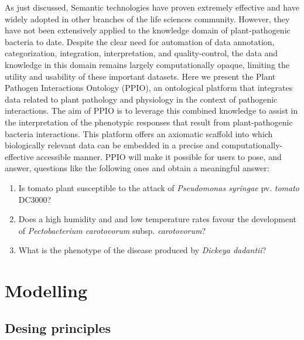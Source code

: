 \documentclass[sw]{iosart2c}
\begin{document}
As just discussed, Semantic technologies have proven extremely effective and have widely adopted in other branches of the life sciences community. However, they have not been extensively applied to the knowledge domain of plant-pathogenic bacteria to date. Despite the clear need for automation of data annotation, categorization, integration, interpretation, and quality-control, the data and knowledge in this domain remains largely computationally opaque, limiting the utility and usability of these important datasets. Here we present the Plant Pathogen Interactions Ontology (PPIO), an ontological platform that integrates data related to plant pathology and physiology in the context of pathogenic interactions. The aim of PPIO is to leverage this combined knowledge to assist in the interpretation of the phenotypic responses that result from plant-pathogenic bacteria interactions. This platform offers an axiomatic scaffold into which biologically relevant data can be embedded in a precise and computationally-effective accessible manner. PPIO will make it possible for users to pose, and answer, questions like the following ones and obtain a meaningful answer:

\begin{enumerate}
\item Is tomato plant susceptible to the attack of {\itshape Pseudomonas syringae} pv. {\itshape tomato} DC3000?
\item Does a high humidity and and low temperature rates favour the development of {\itshape Pectobacterium carotovorum} subsp. {\itshape carotovorum}?
\item What is the phenotype of the disease produced by {\itshape Dickeya dadantii}?

\end{enumerate}





\section{Modelling}
\subsection{Desing principles}
\end{document}
